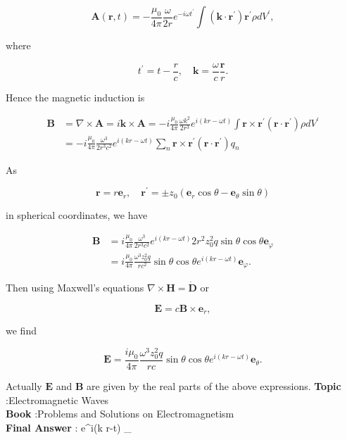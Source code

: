 \documentclass[10pt]{article}
\begin{document}
$$
\mathbf{A}(\mathbf{r}, t)=-\frac{\mu_{0}}{4 \pi} \frac{\omega}{2 r} e^{-i \omega t^{\prime}} \int\left(\mathbf{k} \cdot \mathbf{r}^{\prime}\right) \mathbf{r}^{\prime} \rho d V^{\prime},
$$

where

$$
t^{\prime}=t-\frac{r}{c}, \quad \mathbf{k}=\frac{\omega}{c} \frac{\mathbf{r}}{r} .
$$



Hence the magnetic induction is

$$
\begin{aligned}
\mathbf{B} &=\nabla \times \mathbf{A}=i \mathbf{k} \times \mathbf{A}=-i \frac{\mu_{0}}{4 \pi} \frac{\omega k^{2}}{2 r^{3}} e^{i(k r-\omega t)} \int \mathbf{r} \times \mathbf{r}^{\prime}\left(\mathbf{r} \cdot \mathbf{r}^{\prime}\right) \rho d V^{\prime} \\
&=-i \frac{\mu_{0}}{4 \pi} \frac{\omega^{3}}{2 r^{3} c^{2}} e^{i(k r-\omega t)} \sum_{n} \mathbf{r} \times \mathbf{r}^{\prime}\left(\mathbf{r} \cdot \mathbf{r}^{\prime}\right) q_{n}
\end{aligned}
$$

As

$$
\mathbf{r}=r \mathbf{e}_{r}, \quad \mathbf{r}^{\prime}=\pm z_{0}\left(\mathbf{e}_{r} \cos \theta-\mathbf{e}_{\theta} \sin \theta\right)
$$

in spherical coordinates, we have

$$
\begin{aligned}
\mathbf{B} &=i \frac{\mu_{0}}{4 \pi} \frac{\omega^{3}}{2 r^{3} c^{2}} e^{i(k r-\omega t)} 2 r^{2} z_{0}^{2} q \sin \theta \cos \theta \mathbf{e}_{\varphi} \\
&=i \frac{\mu_{0}}{4 \pi} \frac{\omega^{3} z_{0}^{2} q}{r c^{2}} \sin \theta \cos \theta e^{i(k r-\omega t)} \mathbf{e}_{\varphi} .
\end{aligned}
$$

Then using Maxwell's equations $\nabla \times \mathbf{H}=\dot{\mathbf{D}}$ or

$$
\mathbf{E}=c \mathbf{B} \times \mathbf{e}_{r},
$$

we find

$$
\mathbf{E}=\frac{i \mu_{0}}{4 \pi} \frac{\omega^{3} z_{0}^{2} q}{r c} \sin \theta \cos \theta e^{i(k r-\omega t)} \mathbf{e}_{\theta} .
$$

Actually $\mathbf{E}$ and $\mathbf{B}$ are given by the real parts of the above expressions.
\textbf{Topic} :Electromagnetic Waves\\
\textbf{Book} :Problems and Solutions on Electromagnetism\\
\textbf{Final Answer} :  \sin \theta \cos \theta e^{i(k r-\omega t)} _{\theta}\\
\end{document}
